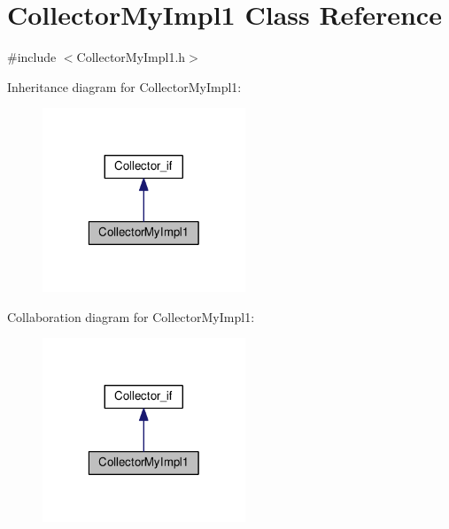 \hypertarget{class_collector_my_impl1}{\section{Collector\-My\-Impl1 Class Reference}
\label{class_collector_my_impl1}
}


{\ttfamily \#include $<$Collector\-My\-Impl1.\-h$>$}



Inheritance diagram for Collector\-My\-Impl1\-:
\nopagebreak
\begin{figure}[H]
\begin{center}
\leavevmode
\includegraphics[width=172pt]{class_collector_my_impl1__inherit__graph}
\end{center}
\end{figure}


Collaboration diagram for Collector\-My\-Impl1\-:
\nopagebreak
\begin{figure}[H]
\begin{center}
\leavevmode
\includegraphics[width=172pt]{class_collector_my_impl1__coll__graph}
\end{center}
\end{figure}
